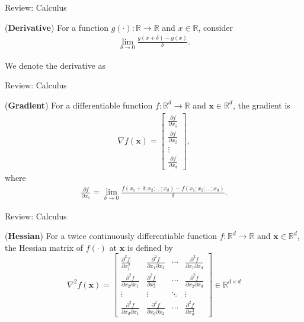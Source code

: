 \documentclass{beamer}
\def\reals{\mathbb{R}}
\begin{document}
\begin{frame}{Review: Calculus}

\Large 
(\textbf{Derivative}) For a function $g(\cdot): \reals \to \reals$ and $x \in \reals$,
consider
\begin{align*}
    \lim_{\delta \to 0} \frac{g(x+\delta) - g(x)}{\delta}.
\end{align*}

We denote the derivative as
\begin{alertblock}{}
\hfill \break
\hfill \break
\end{alertblock}

\end{frame}

\begin{frame}{Review: Calculus}

\Large 

(\textbf{Gradient}) For a differentiable function $f: \reals^d \to \reals$ and $\mathbf{x} \in \reals^d$, 
the gradient is 
\begin{align*}
    \nabla f(\mathbf{x}) = \begin{bmatrix} \frac{\partial f}{\partial x_1} \\ \frac{\partial f}{\partial x_2} \\ \vdots \\ \frac{\partial f}{\partial x_d} \end{bmatrix},
\end{align*}
where
\begin{align*}
    \frac{\partial f}{\partial x_1} = \lim_{\delta \to 0} \frac{f(x_1+\delta; x_2 ; \ldots ; x_d ) - f(x_1 ; x_2 ; \ldots ; x_d )}{\delta}.
\end{align*}


\end{frame}

\begin{frame}{Review: Calculus}
\Large 
\begin{definition}
(\textbf{Hessian}) For a twice continuously differentiable function $f: \reals^d \to \reals$ and $\mathbf{x} \in \reals^d$, the Hessian matrix of $f(\cdot)$ at $\mathbf{x}$ is defined by
$$
 \nabla^2f(\mathbf{x})= \begin{bmatrix} \frac{\partial^2 f}{\partial x_1^2} & \frac{\partial^2 f}{\partial x_1 \partial x_2} & \cdots & \frac{\partial^2 f}{\partial x_1 \partial x_d} \\ \frac{\partial^2 f}{\partial x_2 \partial x_1} & \frac{\partial^2 f}{\partial x_2^2} & \cdots & \frac{\partial^2 f}{\partial x_2 \partial x_d} \\ \vdots & \vdots & \ddots & \vdots \\ \frac{\partial^2 f}{\partial x_d \partial x_1} & \frac{\partial^2 f}{\partial x_d \partial x_2} & \cdots & \frac{\partial^2 f}{\partial x_d^2} \end{bmatrix} \in \reals^{d \times d}
$$
\end{definition}



\end{frame}
\end{document}
